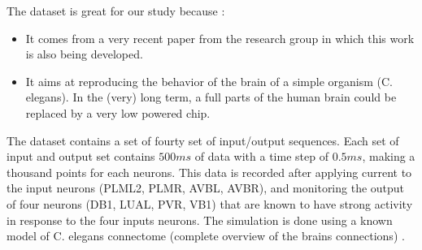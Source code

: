 The dataset is great for our study because :
\begin{itemize}
  \item It comes from a very recent paper from the research group in which this work is also being developed.
  \item It aims at reproducing the behavior of the brain of a simple organism (\ac{C. elegans}). In the (very) long term, a full parts of the human brain could be replaced by a very low powered chip.
\end{itemize}

The dataset contains a set of fourty set of input/output sequences. Each set of input and output set contains $500ms$ of data with a time step of $0.5ms$, making a thousand points for each neurons. This data is recorded after applying current to the input neurons (PLML2, PLMR, AVBL, AVBR), and monitoring the output of four neurons (DB1, LUAL, PVR, VB1) that are known to have strong activity in response to the four inputs neurons. The simulation is done using a known model of \ac{C. elegans} connectome (complete overview of the brains connections) \cite{celegans}.
